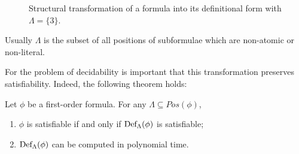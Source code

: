\begin{figure}[H]
  \centering
  \begin{minipage}[t]{.3\textwidth}
  \end{minipage}
  \begin{minipage}[t]{.3\textwidth}
  \end{minipage}
  \caption{Structural transformation of a formula into its definitional form with \(\Lambda = \{3\}\).}\label{fig:definitional-form}
\end{figure}

Usually \(\Lambda\) is the subset of all positions of subformulae which are non-atomic or non-literal.

For the problem of decidability is important that this transformation preserves satisfiability. Indeed, the following theorem holds:

\begin{theorem}\label{thm:definitional-sat-preservation}
  Let \(\phi\) be a first-order formula. For any \(\Lambda \subseteq Pos(\phi)\),
  \begin{enumerate}
    \item \(\phi\) is satisfiable if and only if \(\fldef{\Lambda}{\phi}\) is satisfiable;
    \item \(\fldef{\Lambda}{\phi}\) can be computed in polynomial time.
  \end{enumerate}
\end{theorem} 

